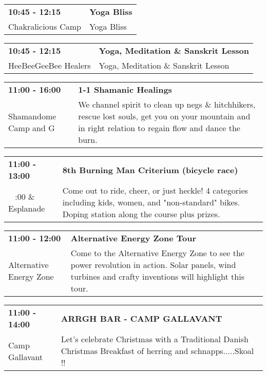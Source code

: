 \begin{tabular}{ p{1in} p{2.2in} }
    \textbf{10:45 - 12:15} & \textbf{Yoga Bliss} \\
    Chakralicious Camp \newline  & Yoga Bliss \\
    \hline 
\end{tabular}
    
\begin{tabular}{ p{1in} p{2.2in} }
    \textbf{10:45 - 12:15} & \textbf{Yoga, Meditation \& Sanskrit Lesson} \\
    HeeBeeGeeBee Healers \newline  & Yoga, Meditation \& Sanskrit Lesson \\
    \hline 
\end{tabular}
    
\begin{tabular}{ p{1in} p{2.2in} }
    \textbf{11:00 - 16:00} & \textbf{1-1 Shamanic Healings} \\
    Shamandome Camp \newline 615 and G & We channel spirit to clean up negs \& hitchhikers, rescue lost souls, get you on your mountain and in right relation to regain flow and dance the burn. \\
    \hline 
\end{tabular}
    
\begin{tabular}{ p{1in} p{2.2in} }
    \textbf{11:00 - 13:00} & \textbf{8th Burning Man Criterium (bicycle race)} \\
    ~ \newline 11:00 \& Esplanade & Come out to ride, cheer, or just heckle! 4 categories including kids, women, and "non-standard" bikes. Doping station along the course plus prizes. \\
    \hline 
\end{tabular}
    
\begin{tabular}{ p{1in} p{2.2in} }
    \textbf{11:00 - 12:00} & \textbf{Alternative Energy Zone Tour} \\
    Alternative Energy Zone \newline  & Come to the Alternative Energy Zone to see the power revolution in action. Solar panels, wind turbines and crafty inventions will highlight this tour. \\
    \hline 
\end{tabular}
    
\begin{tabular}{ p{1in} p{2.2in} }
    \textbf{11:00 - 14:00} & \textbf{ARRGH BAR - CAMP GALLAVANT} \\
    Camp Gallavant \newline  & Let's celebrate Christmas with a Traditional Danish Christmas Breakfast of herring and schnapps.....Skoal !! \\
    \hline 
\end{tabular}
    
